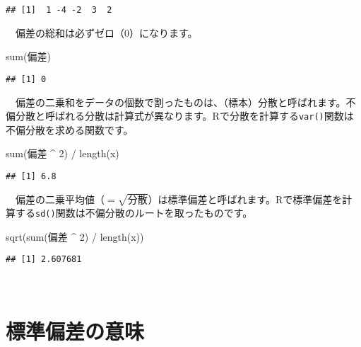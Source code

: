 \documentclass[
  12pt,
]{book}
\newenvironment{Shaded}{\begin{snugshade}}{\end{snugshade}}
\newcommand{\AttributeTok}[1]{\textcolor[rgb]{0.77,0.63,0.00}{#1}}
\newcommand{\DecValTok}[1]{\textcolor[rgb]{0.00,0.00,0.81}{#1}}
\newcommand{\FunctionTok}[1]{\textcolor[rgb]{0.00,0.00,0.00}{#1}}
\newcommand{\NormalTok}[1]{#1}
\newcommand{\SpecialCharTok}[1]{\textcolor[rgb]{0.00,0.00,0.00}{#1}}
\newcommand{\StringTok}[1]{\textcolor[rgb]{0.31,0.60,0.02}{#1}}
\begin{document}
\begin{verbatim}
## [1]  1 -4 -2  3  2
\end{verbatim}

　偏差の総和は必ずゼロ（\(0\)）になります。

\begin{Shaded}
\begin{Highlighting}[]
\FunctionTok{sum}\NormalTok{(}\StringTok{\textasciigrave{}}\AttributeTok{偏差}\StringTok{\textasciigrave{}}\NormalTok{)}
\end{Highlighting}
\end{Shaded}

\begin{verbatim}
## [1] 0
\end{verbatim}

　偏差の二乗和をデータの個数で割ったものは、（標本）分散と呼ばれます。不偏分散と呼ばれる分散は計算式が異なります。Rで分散を計算する\texttt{var()}関数は不偏分散を求める関数です。

\begin{Shaded}
\begin{Highlighting}[]
\FunctionTok{sum}\NormalTok{(}\StringTok{\textasciigrave{}}\AttributeTok{偏差}\StringTok{\textasciigrave{}} \SpecialCharTok{\^{}} \DecValTok{2}\NormalTok{) }\SpecialCharTok{/} \FunctionTok{length}\NormalTok{(x)}
\end{Highlighting}
\end{Shaded}

\begin{verbatim}
## [1] 6.8
\end{verbatim}

　偏差の二乗平均値（\(= \sqrt{\mbox{分散}}\)）は標準偏差と呼ばれます。Rで標準偏差を計算する\texttt{sd()}関数は不偏分散のルートを取ったものです。

\begin{Shaded}
\begin{Highlighting}[]
\FunctionTok{sqrt}\NormalTok{(}\FunctionTok{sum}\NormalTok{(}\StringTok{\textasciigrave{}}\AttributeTok{偏差}\StringTok{\textasciigrave{}} \SpecialCharTok{\^{}} \DecValTok{2}\NormalTok{) }\SpecialCharTok{/} \FunctionTok{length}\NormalTok{(x))}
\end{Highlighting}
\end{Shaded}

\begin{verbatim}
## [1] 2.607681
\end{verbatim}

　

\hypertarget{ux6a19ux6e96ux504fux5deeux306eux610fux5473}{%
\section{標準偏差の意味}\label{ux6a19ux6e96ux504fux5deeux306eux610fux5473}}
\end{document}
